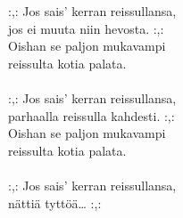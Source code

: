 
            :,: Jos sais’ kerran reissullansa, \\
            jos ei muuta niin hevosta. :,: \\
            Oishan se paljon mukavampi \\
            reissulta kotia palata. \\
\hspace{10mm} \\
            :,: Jos sais’ kerran reissullansa, \\
            parhaalla reissulla kahdesti. :,: \\
            Oishan se paljon mukavampi \\
            reissulta kotia palata. \\
\hspace{10mm} \\
            :,: Jos sais’ kerran reissullansa, \\
            nättiä tyttöä… :,: \\
